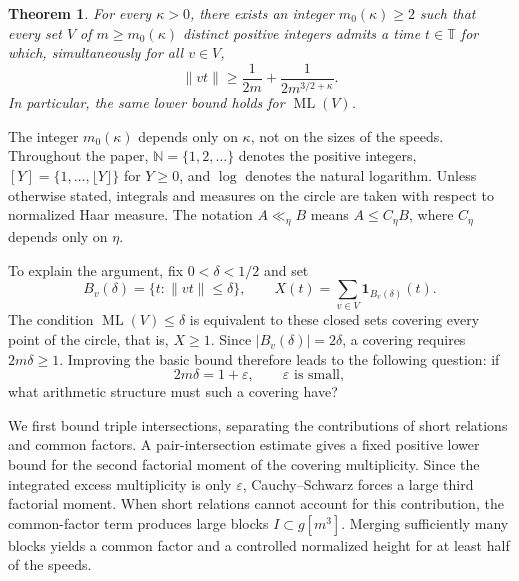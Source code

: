 \documentclass[12pt,leqno]{article}
\numberwithin{equation}{section}
\newtheorem{theorem}{Theorem}[section]
\theoremstyle{remark}
\newcommand{\LRtorus}{\mathbb T}
\newcommand{\LRnatural}{\mathbb N}
\newcommand{\LRindicator}{\mathbf 1}
\newcommand{\LRloneliness}{\operatorname{ML}}
\begin{document}
\begin{theorem}\label{thm:main}
For every $\kappa>0$, there exists an integer $m_0(\kappa)\ge2$ such that every set $V$ of $m\ge m_0(\kappa)$ distinct positive integers admits a time $t\in\LRtorus$ for which, simultaneously for all $v\in V$,
\begin{equation}\label{eq:main}
\|vt\|\ge\frac1{2m}+\frac1{2m^{3/2+\kappa}}.
\end{equation}
In particular, the same lower bound holds for $\LRloneliness(V)$.
\end{theorem}

The integer $m_0(\kappa)$ depends only on $\kappa$, not on the sizes of the speeds. Throughout the paper, $\LRnatural=\{1,2,\ldots\}$ denotes the positive integers, $[Y]=\{1,\ldots,\lfloor Y\rfloor\}$ for $Y\ge0$, and $\log$ denotes the natural logarithm. Unless otherwise stated, integrals and measures on the circle are taken with respect to normalized Haar measure. The notation $A\ll_\eta B$ means $A\le C_\eta B$, where $C_\eta$ depends only on $\eta$.

To explain the argument, fix $0<\delta<1/2$ and set
\begin{equation}\label{eq:bohr}
B_v(\delta)=\{t:\|vt\|\le\delta\},\qquad
X(t)=\sum_{v\in V}\LRindicator_{B_v(\delta)}(t).
\end{equation}
The condition $\LRloneliness(V)\le\delta$ is equivalent to these closed sets covering every point of the circle, that is, $X\ge1$. Since $|B_v(\delta)|=2\delta$, a covering requires $2m\delta\ge1$. Improving the basic bound therefore leads to the following question: if
\[
2m\delta=1+\varepsilon,\qquad \varepsilon\text{ is small},
\]
what arithmetic structure must such a covering have?

We first bound triple intersections, separating the contributions of short relations and common factors. A pair-intersection estimate gives a fixed positive lower bound for the second factorial moment of the covering multiplicity. Since the integrated excess multiplicity is only $\varepsilon$, Cauchy--Schwarz forces a large third factorial moment. When short relations cannot account for this contribution, the common-factor term produces large blocks $I\subset g[m^3]$. Merging sufficiently many blocks yields a common factor and a controlled normalized height for at least half of the speeds.
\end{document}
